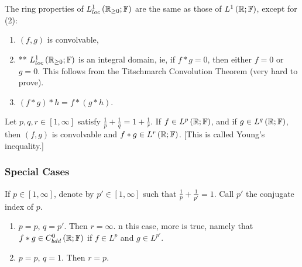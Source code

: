 The ring properties of $L^{1}_{loc}\left( \mathbb{R}_{\ge  0}; \mathbb{F} \right)$ are the same as those of  $L^{1}\left( \mathbb{R}; \mathbb{F} \right)$, except for (2):
	\begin{enumerate}
		\item $\left( f, g \right) $ is convolvable, 
		\item ** $L^{1}_{loc}\left( \mathbb{R}_{\ge  0}; \mathbb{F} \right) $ is an integral domain, ie, if $f * g = 0$, then either $f = 0 $ or $g = 0$. This follows from the Titschmarch Convolution Theorem (very hard to prove).  
		\item $\left( f * g \right) * h = f * \left( g * h \right) $.
	\end{enumerate}

\begin{theorem}
	Let $p, q, r \in  \left[ 1, \infty \right] $ satisfy $\frac{1}{p} + \frac{1}{q} = 1 + \frac{1}{r}$. If $f \in L^{p}\left( \mathbb{R}; \mathbb{F} \right) $, and if $g \in  L^{q}\left( \mathbb{R}; \mathbb{F} \right) $, then $\left( f, g  \right) $ is convolvable and $f * g \in  L ^{r}\left( \mathbb{R}; \mathbb{F} \right) $. [This is called Young's inequality.]	
\end{theorem}

\subsubsection{Special Cases}
If $p \in  \left[ 1, \infty \right] $, denote by $p' \in  \left[ 1, \infty \right] $ such that $\frac{1}{p} + \frac{1}{p'} = 1$. Call $p'$ the conjugate index of $p$. 
\begin{enumerate}
	\item $p = p$, $q = p'$. Then $r = \infty$. n this case, more is true, namely that $f * g \in  C^{0}_{bdd}\left( \mathbb{R}; \mathbb{F} \right) $ if $f \in L^{p}$ and $g \in  L^{p'}$. 
	\item $p = p $, $q = 1$. Then $r = p$. 
\end{enumerate}
